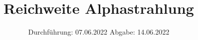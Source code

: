 

\subject{VERSUCH NUMMER 701}
\title{Reichweite Alphastrahlung}
\date{%
  Durchführung: 07.06.2022
  \hspace{3em}
  Abgabe: 14.06.2022
}



\maketitle
\thispagestyle{empty}
\tableofcontents
\newpage





\printbibliography{}



